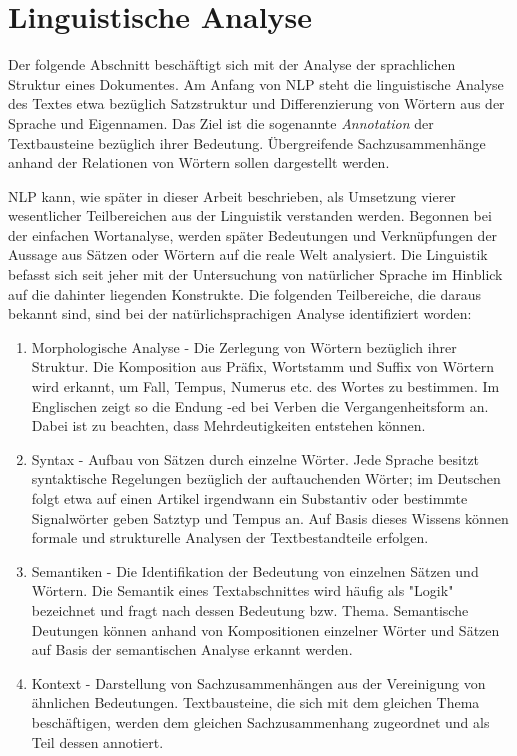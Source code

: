 \documentclass[12pt]{report}
\begin{document}
\section{Linguistische Analyse}
Der folgende Abschnitt beschäftigt sich mit der Analyse der sprachlichen Struktur eines Dokumentes. Am Anfang von NLP steht die linguistische Analyse des Textes etwa bezüglich Satzstruktur und Differenzierung von Wörtern aus der Sprache und Eigennamen. Das Ziel ist die sogenannte \textit{Annotation} der Textbausteine bezüglich ihrer Bedeutung. Übergreifende Sachzusammenhänge anhand der Relationen von Wörtern sollen dargestellt werden.

NLP kann, wie später in dieser Arbeit beschrieben, als Umsetzung vierer wesentlicher Teilbereichen aus der Linguistik verstanden werden. Begonnen bei der einfachen Wortanalyse, werden später Bedeutungen und Verknüpfungen der Aussage aus Sätzen oder Wörtern auf die reale Welt analysiert. Die Linguistik befasst sich seit jeher mit der Untersuchung von natürlicher Sprache im Hinblick auf die dahinter liegenden Konstrukte. Die folgenden Teilbereiche, die daraus bekannt sind, sind bei der natürlichsprachigen Analyse identifiziert worden:

\begin{enumerate}
\item
Morphologische Analyse - Die Zerlegung von Wörtern bezüglich ihrer Struktur. Die Komposition aus Präfix, Wortstamm und Suffix von Wörtern wird erkannt, um Fall, Tempus, Numerus etc. des Wortes zu bestimmen. Im Englischen zeigt so die Endung -ed bei Verben die Vergangenheitsform an. Dabei ist zu beachten, dass Mehrdeutigkeiten entstehen können.
\item
Syntax - Aufbau von Sätzen durch einzelne Wörter. Jede Sprache besitzt syntaktische Regelungen bezüglich der auftauchenden Wörter; im Deutschen folgt etwa auf einen Artikel irgendwann ein Substantiv oder bestimmte Signalwörter geben Satztyp und Tempus an. Auf Basis dieses Wissens können formale und strukturelle Analysen der Textbestandteile erfolgen.
\item
Semantiken - Die Identifikation der Bedeutung von einzelnen Sätzen und Wörtern. Die Semantik eines Textabschnittes wird häufig als "Logik" bezeichnet und fragt nach dessen Bedeutung bzw. Thema. Semantische Deutungen können anhand von Kompositionen einzelner Wörter und Sätzen auf Basis der semantischen Analyse erkannt werden.
\item
Kontext - Darstellung von Sachzusammenhängen aus der Vereinigung von ähnlichen Bedeutungen. Textbausteine, die sich mit dem gleichen Thema beschäftigen, werden dem gleichen Sachzusammenhang zugeordnet und als Teil dessen annotiert.
\end{enumerate}
\end{document}
